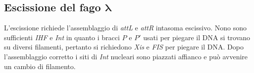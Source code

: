 	\subsection{Escissione del fago $\mathbf{\lambda}$}
	L'escissione richiede l'assemblaggio di \emph{attL} e \emph{attR} intasoma escissivo.
	Nono sono sufficienti \emph{IHF} e \emph{Int} in quanto i bracci $P$ e $P'$ usati per piegare il DNA si trovano su diversi filamenti, pertanto si richiedono \emph{Xis} e \emph{FIS} per piegare il DNA.
	Dopo l'assemblaggio corretto i siti di \emph{Int} nucleari sono piazzati affianco e pu\`o avvenire un cambio di filamento.
